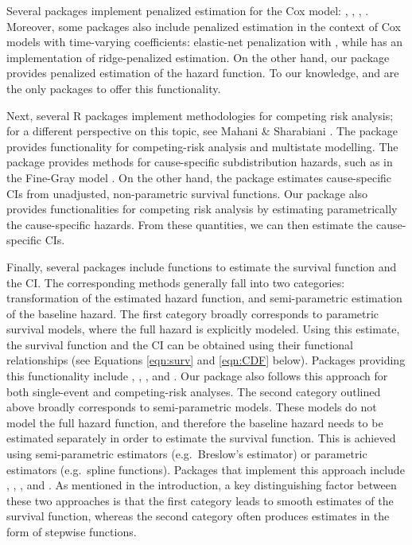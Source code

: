 Several packages implement penalized estimation for the Cox model:
 \citeyearpar{regpathcox}, 
\citeyearpar{park_hastie},  \citeyearpar{l1penal},
 \citeyearpar{gerds_blanche}. Moreover, some
packages also include penalized estimation in the context of Cox models
with time-varying coefficients: elastic-net penalization with
 \citeyearpar{clements_liu}, while 
\citeyearpar{survival-package} has an implementation of ridge-penalized
estimation. On the other hand, our package  provides
penalized estimation of the hazard function. To our knowledge,
 and  are the only packages to offer this
functionality.

Next, several R packages implement methodologies for competing risk
analysis; for a different perspective on this topic, see Mahani \&
Sharabiani \citeyearpar{mahani2015bayesian}. The package 
provides functionality for competing-risk analysis and multistate
modelling. The package  provides methods for
cause-specific subdistribution hazards, such as in the Fine-Gray model
\citeyearpar{fine1999proportional}. On the other hand, the package
 estimates cause-specific CIs from unadjusted, non-parametric
survival functions. Our package  also provides
functionalities for competing risk analysis by estimating parametrically
the cause-specific hazards. From these quantities, we can then estimate
the cause-specific CIs.

Finally, several packages include functions to estimate the survival
function and the CI. The corresponding methods generally fall into two
categories: transformation of the estimated hazard function, and
semi-parametric estimation of the baseline hazard. The first category
broadly corresponds to parametric survival models, where the full hazard
is explicitly modeled. Using this estimate, the survival function and
the CI can be obtained using their functional relationships (see
Equations \ref{eqn:surv} and \ref{eqn:CDF} below). Packages providing
this functionality include , , , and
. Our package  also follows this approach
for both single-event and competing-risk analyses. The second category
outlined above broadly corresponds to semi-parametric models. These
models do not model the full hazard function, and therefore the baseline
hazard needs to be estimated separately in order to estimate the
survival function. This is achieved using semi-parametric estimators
(e.g.~Breslow's estimator) or parametric estimators (e.g.~spline
functions). Packages that implement this approach include
, , , and . As
mentioned in the introduction, a key distinguishing factor between these
two approaches is that the first category leads to smooth estimates of
the survival function, whereas the second category often produces
estimates in the form of stepwise functions.

